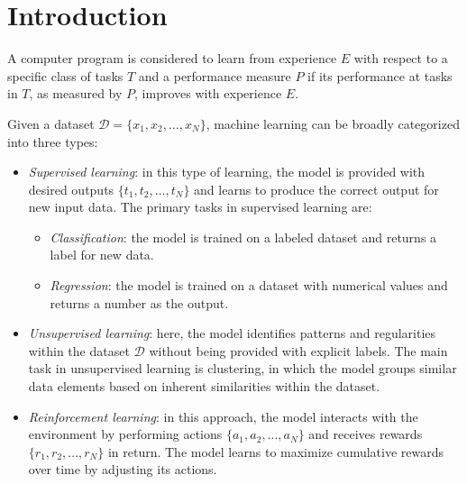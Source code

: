 \section{Introduction}

\begin{definition}
    A computer program is considered to learn from experience $E$ with respect to a specific class of tasks $T$ and a performance measure $P$ if its performance at tasks in $T$, as measured by $P$, improves with experience $E$.
\end{definition}
Given a dataset $\mathcal{D} = \{x_1, x_2, \dots, x_N\}$, machine learning can be broadly categorized into three types:
\begin{itemize} 
    \item \textit{Supervised learning}: in this type of learning, the model is provided with desired outputs $\{t_1, t_2, \dots, t_N\}$ and learns to produce the correct output for new input data. 
        The primary tasks in supervised learning are: 
        \begin{itemize} 
            \item \textit{Classification}: the model is trained on a labeled dataset and returns a label for new data. 
            \item \textit{Regression}: the model is trained on a dataset with numerical values and returns a number as the output. 
        \end{itemize} 
    \item \textit{Unsupervised learning}: here, the model identifies patterns and regularities within the dataset $\mathcal{D}$ without being provided with explicit labels. 
        The main task in unsupervised learning is clustering, in which the model groups similar data elements based on inherent similarities within the dataset. 
    \item \textit{Reinforcement learning}: in this approach, the model interacts with the environment by performing actions $\{a_1, a_2, \dots, a_N\}$ and receives rewards $\{r_1, r_2, \dots, r_N\}$ in return. 
        The model learns to maximize cumulative rewards over time by adjusting its actions. 
\end{itemize}